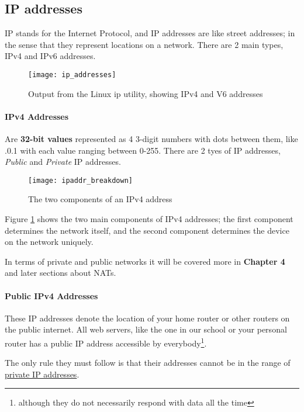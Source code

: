 \documentclass[../main.tex]{subfiles}
\begin{document}
\subsection{IP addresses}

IP stands for the Internet Protocol, and IP addresses are like street addresses; in the sense that they represent locations on a network. There are 2 main types, IPv4 and IPv6 addresses.

\begin{figure}[h]
    \centering
    \texttt{[image: ip\_addresses]}
    \caption{Output from the Linux {\mono ip} utility, showing IPv4 and V6 addresses}
\end{figure}

\paragraph{IPv4 Addresses}

Are \textbf{32-bit values} represented as 4 3-digit numbers with dots between them, like {.0.1} with each value ranging between 0-255. There are 2 tyes of IP addresses, \emph{Public} and \emph{Private} IP addresses.

\begin{figure}[h]
    \centering
    \texttt{[image: ipaddr\_breakdown]}
    \caption{The two components of an IPv4 address}
    \label{fig:ipaddr_breakdown}
\end{figure}

Figure \ref{fig:ipaddr_breakdown} shows the two main components of IPv4 addresses; the first component determines the network itself, and the second component determines the device on the network uniquely.

In terms of private and public networks it will be covered more in \textbf{Chapter 4} and later sections about NATs.

\paragraph{Public IPv4 Addresses}

These IP addresses denote the location of your home router or other routers on the public internet. All web servers, like the one in our school or your personal router has a public IP address accessible by everybody\footnote{although they do not necessarily respond with data all the time}.

The only rule they must follow is that their addresses cannot be in the range of \hyperref[tab:private_ip_classes]{private IP addresses}.
\end{document}
